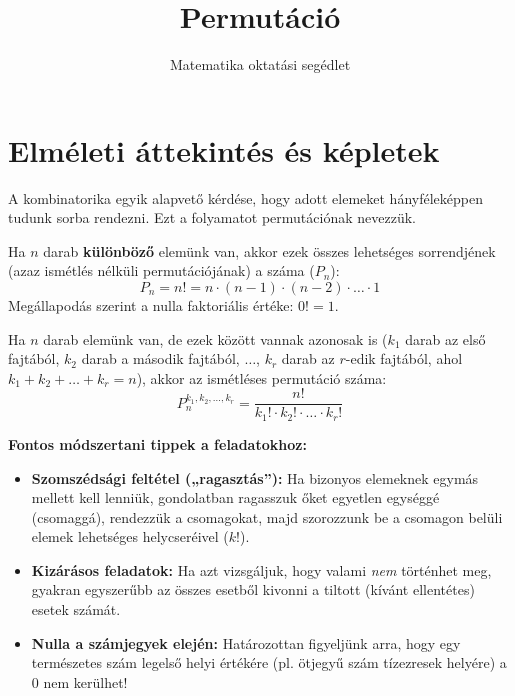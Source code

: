 \documentclass[12pt,a4paper]{article}
\title{Permutáció}
\author{Matematika oktatási segédlet}
\date{}
\begin{document}
\maketitle

\section*{Elméleti áttekintés és képletek}

A kombinatorika egyik alapvető kérdése, hogy adott elemeket hányféleképpen tudunk sorba rendezni. Ezt a folyamatot permutációnak nevezzük.

\begin{tcolorbox}[colback=gray!5!white,colframe=gray!40!black,title=1. Ismétlés nélküli permutáció, fonttitle=\bfseries, arc=2mm, boxrule=0.5mm]
Ha $n$ darab \textbf{különböző} elemünk van, akkor ezek összes lehetséges sorrendjének (azaz ismétlés nélküli permutációjának) a száma ($P_n$):
\begin{equation*}
    P_n = n! = n \cdot (n - 1) \cdot (n - 2) \cdot \dots \cdot 1
\end{equation*}
Megállapodás szerint a nulla faktoriális értéke: $0! = 1$.
\end{tcolorbox}

\begin{tcolorbox}[colback=gray!5!white,colframe=gray!40!black,title=2. Ismétléses permutáció, fonttitle=\bfseries, arc=2mm, boxrule=0.5mm]
Ha $n$ darab elemünk van, de ezek között vannak azonosak is ($k_1$ darab az első fajtából, $k_2$ darab a második fajtából, $\dots$, $k_r$ darab az $r$-edik fajtából, ahol $k_1 + k_2 + \dots + k_r = n$), akkor az ismétléses permutáció száma:
\begin{equation}
    P_n^{k_1, k_2, \dots, k_r} = \frac{n!}{k_1! \cdot k_2! \cdot \dots \cdot k_r!}
\end{equation}
\end{tcolorbox}

\vspace{0.3cm}
\noindent\textbf{Fontos módszertani tippek a feladatokhoz:}
\begin{itemize}
    \item \textbf{Szomszédsági feltétel („ragasztás”):} Ha bizonyos elemeknek egymás mellett kell lenniük, gondolatban ragasszuk őket egyetlen egységgé (csomaggá), rendezzük a csomagokat, majd szorozzunk be a csomagon belüli elemek lehetséges helycseréivel ($k!$).
    \item \textbf{Kizárásos feladatok:} Ha azt vizsgáljuk, hogy valami \emph{nem} történhet meg, gyakran egyszerűbb az összes esetből kivonni a tiltott (kívánt ellentétes) esetek számát.
    \item \textbf{Nulla a számjegyek elején:} Határozottan figyeljünk arra, hogy egy természetes szám legelső helyi értékére (pl. ötjegyű szám tízezresek helyére) a $0$ nem kerülhet!
\end{itemize}
\end{document}
